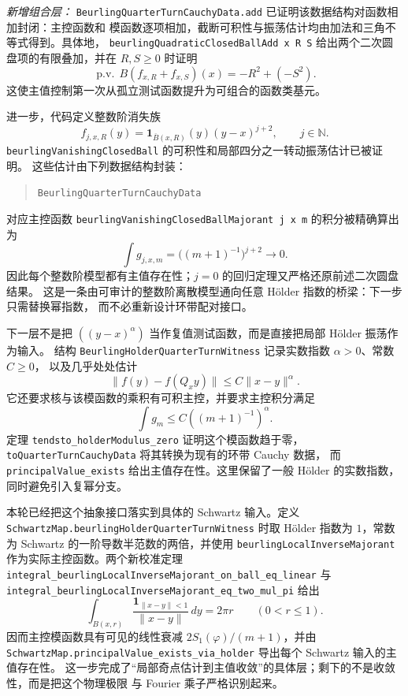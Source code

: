 \documentclass[UTF8,fontset=none,a4paper,11pt]{ctexart}
\begin{document}
\textit{新增组合层：} \texttt{BeurlingQuarterTurnCauchyData.add} 已证明该数据结构对函数相加封闭：主控函数和
模函数逐项相加，截断可积性与振荡估计均由加法和三角不等式得到。具体地，
\texttt{beurlingQuadraticClosedBallAdd x R S} 给出两个二次圆盘项的有限叠加，并在
\(R,S\ge0\) 时证明
\[
 \operatorname{p.v.}\,B(f_{x,R}+f_{x,S})(x)=-R^2+(-S^2).
\]
这使主值控制第一次从孤立测试函数提升为可组合的函数类基元。\par

进一步，代码定义整数阶消失族
\[
 f_{j,x,R}(y)=\mathbf 1_{\overline B(x,R)}(y)(y-x)^{j+2},
 \qquad j\in\mathbb N.
\]
\texttt{beurlingVanishingClosedBall} 的可积性和局部四分之一转动振荡估计已被证明。
这些估计由下列数据结构封装：
\begin{quote}
\texttt{BeurlingQuarterTurnCauchyData}
\end{quote}
对应主控函数
\texttt{beurlingVanishingClosedBallMajorant j x m} 的积分被精确算出为
\[
 \int g_{j,x,m}
   =\bigl((m+1)^{-1}\bigr)^{j+2}\longrightarrow0.
\]
因此每个整数阶模型都有主值存在性；\(j=0\) 的回归定理又严格还原前述二次圆盘结果。
这是一条由可审计的整数阶离散模型通向任意 Hölder 指数的桥梁：下一步只需替换幂指数，
而不必重新设计环带配对接口。\par

下一层不是把 $((y-x)^\alpha)$ 当作复值测试函数，而是直接把局部 Hölder 振荡作为输入。
结构 \texttt{BeurlingHolderQuarterTurnWitness} 记录实数指数 \(\alpha>0\)、常数 \(C\ge0\)，
以及几乎处处估计
\[
 \lVert f(y)-f(Q_x y)\rVert\le C\lVert x-y\rVert^\alpha.
\]
它还要求核与该模函数的乘积有可积主控，并要求主控积分满足
\[
 \int g_m\le C((m+1)^{-1})^\alpha.
\]
定理 \texttt{tendsto\_holderModulus\_zero} 证明这个模函数趋于零，
\texttt{toQuarterTurnCauchyData} 将其转换为现有的环带 Cauchy 数据，
而 \texttt{principalValue\_exists} 给出主值存在性。这里保留了一般 Hölder 的实数指数，
同时避免引入复幂分支。\par

\begin{sloppypar}
本轮已经把这个抽象接口落实到具体的 Schwartz 输入。定义
\texttt{SchwartzMap.\allowbreak beurlingHolderQuarterTurnWitness} 时取 Hölder 指数为 \(1\)，常数为
Schwartz 的一阶导数半范数的两倍，并使用
\texttt{beurlingLocalInverseMajorant} 作为实际主控函数。两个新校准定理
\texttt{integral\_beurlingLocalInverseMajorant\allowbreak\_on\_ball\_eq\_linear} 与
\texttt{integral\_beurlingLocalInverseMajorant\allowbreak\_eq\_two\_mul\_pi} 给出
\[
 \int_{B(x,r)} \frac{\mathbf 1_{\lVert x-y\rVert<1}}{\lVert x-y\rVert}\,dy
 =2\pi r \qquad (0<r\le1).
\]
因而主控模函数具有可见的线性衰减 \(2S_1(\varphi)/(m+1)\)，并由
\texttt{SchwartzMap.\allowbreak principalValue\_exists\_via\_holder} 导出每个 Schwartz 输入的主值存在性。
这一步完成了“局部奇点估计到主值收敛”的具体层；剩下的不是收敛性，而是把这个物理极限
与 Fourier 乘子严格识别起来。\par
\end{sloppypar}
\end{document}
